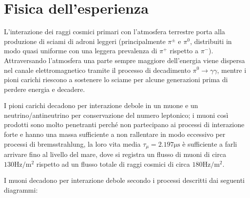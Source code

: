 \documentclass[a4paper, 11pt]{article}
\begin{document}
\tableofcontents
\newpage

\section{Fisica dell'esperienza}
    L'interazione dei raggi cosmici primari con l'atmosfera terrestre porta alla produzione di sciami di adroni leggeri (principalmente $\pi^\pm$ e $\pi^0$, distribuiti in modo quasi uniforme con una leggera prevalenza di $\pi^+$ rispetto a $\pi^-$).
    \\
    Attraversando l'atmosfera una parte sempre maggiore dell'energia viene dispersa nel canale elettromagnetico tramite il processo di decadimento $\pi^0\to\gamma\gamma$, mentre i pioni carichi riescono a sostenere lo sciame per alcune generazioni prima di perdere energia e decadere.
    
    I pioni carichi decadono per interazione debole in un muone e un neutrino/antineutrino per conservazione del numero leptonico; i muoni così prodotti sono molto penetranti perché non partecipano ai processi di interazione forte e hanno una massa sufficiente a non rallentare in modo eccessivo per processi di bremsstrahlung, la loro vita media $\tau_\mu=2.197\unit{\micro\second}$ è sufficiente a farli arrivare fino al livello del mare, dove si registra un flusso di muoni di circa $130\unit{\hertz\per\meter\squared}$ rispetto ad un flusso totale di raggi cosmici di circa $180\unit{\hertz\per\meter\squared}$.
    
    I muoni decadono per interazione debole secondo i processi descritti dai seguenti diagrammi:
    
\end{document}
